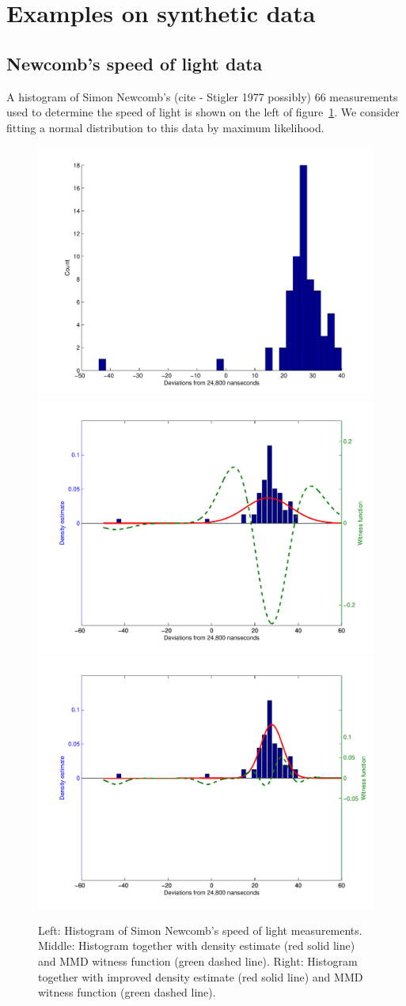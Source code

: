 \documentclass{article} %
\begin{document}

\section{Examples on synthetic data}

\subsection{Newcomb's speed of light data}


A histogram of Simon Newcomb's (cite - Stigler 1977 possibly) 66 measurements used to determine the speed of light is shown on the left of figure~\ref{fig:newcomb}.
We consider fitting a normal distribution to this data by maximum likelihood\footnotemark.

\begin{figure}[ht]
\centering
\includegraphics[width=0.32\columnwidth]{figures/newcomb_hist}
\includegraphics[width=0.32\columnwidth]{figures/newcomb_witness_1}
\includegraphics[width=0.32\columnwidth]{figures/newcomb_witness_2}
\caption{
Left: Histogram of Simon Newcomb's speed of light measurements.
Middle: Histogram together with density estimate (red solid line) and MMD witness function (green dashed line).
Right: Histogram together with improved density estimate (red solid line) and MMD witness function (green dashed line).
}
\label{fig:newcomb}
\end{figure}
\end{document}
